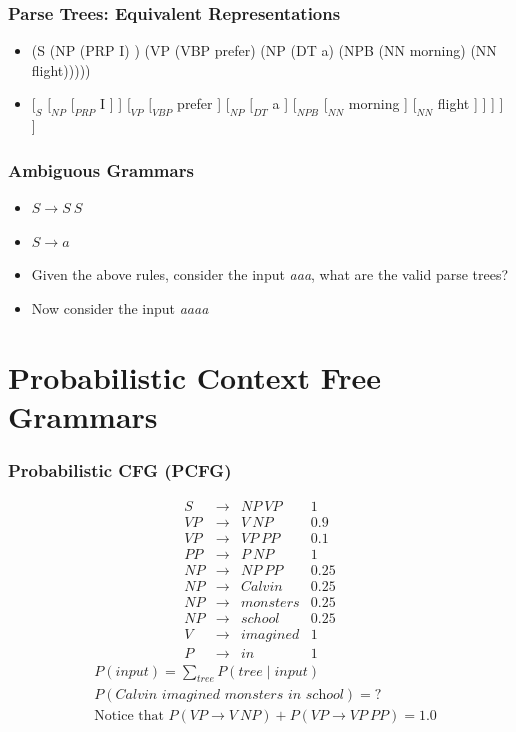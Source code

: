 \begin{frame}
\frametitle{Parse Trees: Equivalent Representations}
\begin{itemize}
\item (S (NP (PRP I) ) (VP (VBP prefer) (NP (DT a) (NPB (NN morning) (NN flight)))))
\item $[_{S}$ $[_{NP}$ $[_{PRP}$ I ] ] $[_{VP}$ $[_{VBP}$ prefer ]
$[_{NP}$ $[_{DT}$ a ] $[_{NPB}$ $[_{NN}$ morning ] $[_{NN}$ flight ] ] ] ] ]
\end{itemize}

\end{frame}

\begin{frame}
\frametitle{Ambiguous Grammars}
\begin{itemize}
\item $S \rightarrow S\ S$
\item $S \rightarrow a$
\item Given the above rules, consider the input {\em aaa}, what are the valid parse trees?
\item Now consider the input {\em aaaa}
\end{itemize}

\end{frame}

\section{Probabilistic Context Free Grammars}

\begin{frame}[fragile]
\frametitle{Probabilistic CFG (PCFG)}
\[
\begin{array}{cccc}
 S & \rightarrow & NP~VP  & 1 \\
 VP & \rightarrow & V~NP  & 0.9 \\
 VP & \rightarrow & VP~PP & 0.1 \\
 PP & \rightarrow & P~NP  & 1 \\
 NP & \rightarrow & NP~PP & 0.25 \\
 NP & \rightarrow & Calvin  & 0.25 \\
 NP & \rightarrow & monsters & 0.25 \\
 NP & \rightarrow & school & 0.25 \\
 V & \rightarrow & imagined  &  1 \\
 P & \rightarrow & in     & 1
\end{array}
\]
\begin{eqnarray}
&P(\textit{input}) = \sum_{\textit{tree}} P(\textit{tree} \mid \textit{input}) \nonumber\\
&P(\textit{Calvin imagined monsters in school}) = ? \nonumber\\
&\textrm{Notice that } P(VP \rightarrow V~NP) + P(VP \rightarrow VP~PP) = 1.0 \nonumber
\end{eqnarray}
\end{frame}

